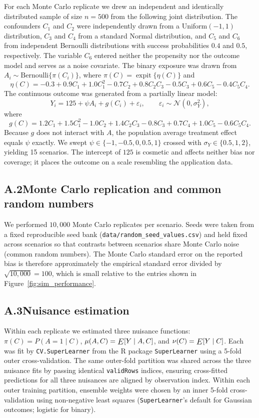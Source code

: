 \documentclass[12pt]{article}
\newcommand{\E}{\mathop{\vcenter{\hbox{\relsize{+1}$E$}}}}
\DeclareMathOperator{\expit}{expit}
\begin{document}
For each Monte Carlo replicate we drew an independent and identically distributed sample of size $n = 500$ from the following joint distribution. The confounders $C_1$ and $C_2$ were independently drawn from a Uniform$(-1, 1)$ distribution, $C_3$ and $C_4$ from a standard Normal distribution, and $C_5$ and $C_6$ from independent Bernoulli distributions with success probabilities $0.4$ and $0.5$, respectively. The variable $C_6$ entered neither the propensity nor the outcome model and serves as a noise covariate. The binary exposure was drawn from $A_i \sim \mathrm{Bernoulli}\{\pi(C_i)\}$, where $\pi(C) = \expit\{\eta(C)\}$ and
$$\eta(C) = -0.3 + 0.9 C_1 + 1.0 C_1^2 - 0.7 C_2 + 0.8 C_2 C_3 - 0.5 C_3 + 0.6 C_5 - 0.4 C_5 C_4.$$
The continuous outcome was generated from a partially linear model:
$$Y_i = 125 + \psi A_i + g(C_i) + \varepsilon_i, \qquad \varepsilon_i \sim \mathcal{N}(0, \sigma_Y^2),$$
where
$$g(C) = 1.2 C_1 + 1.5 C_1^2 - 1.0 C_2 + 1.4 C_2 C_3 - 0.8 C_3 + 0.7 C_4 + 1.0 C_5 - 0.6 C_5 C_4.$$
Because $g$ does not interact with $A$, the population average treatment effect equals $\psi$ exactly. We swept $\psi \in \{-1, -0.5, 0, 0.5, 1\}$ crossed with $\sigma_Y \in \{0.5, 1, 2\}$, yielding 15 scenarios. The intercept of $125$ is cosmetic and affects neither bias nor coverage; it places the outcome on a scale resembling the application data.

\subsection*{A.2\quad Monte Carlo replication and common random numbers}

We performed $10{,}000$ Monte Carlo replicates per scenario. Seeds were taken from a fixed reproducible seed bank (\texttt{data/random\_seed\_values.csv}) and held fixed across scenarios so that contrasts between scenarios share Monte Carlo noise (common random numbers). The Monte Carlo standard error on the reported bias is therefore approximately the empirical standard error divided by $\sqrt{10{,}000} = 100$, which is small relative to the entries shown in Figure~\ref{fig:sim_performance}.

\subsection*{A.3\quad Nuisance estimation}

Within each replicate we estimated three nuisance functions: $\pi(C) = P(A = 1 \mid C)$, $\mu(A, C) = \E[Y \mid A, C]$, and $\nu(C) = \E[Y \mid C]$. Each was fit by \texttt{CV.SuperLearner} from the R package \texttt{SuperLearner} using a 5-fold outer cross-validation. The same outer-fold partition was shared across the three nuisance fits by passing identical \texttt{validRows} indices, ensuring cross-fitted predictions for all three nuisances are aligned by observation index. Within each outer training partition, ensemble weights were chosen by an inner 5-fold cross-validation using non-negative least squares (\texttt{SuperLearner}'s default for Gaussian outcomes; logistic for binary).
\end{document}
